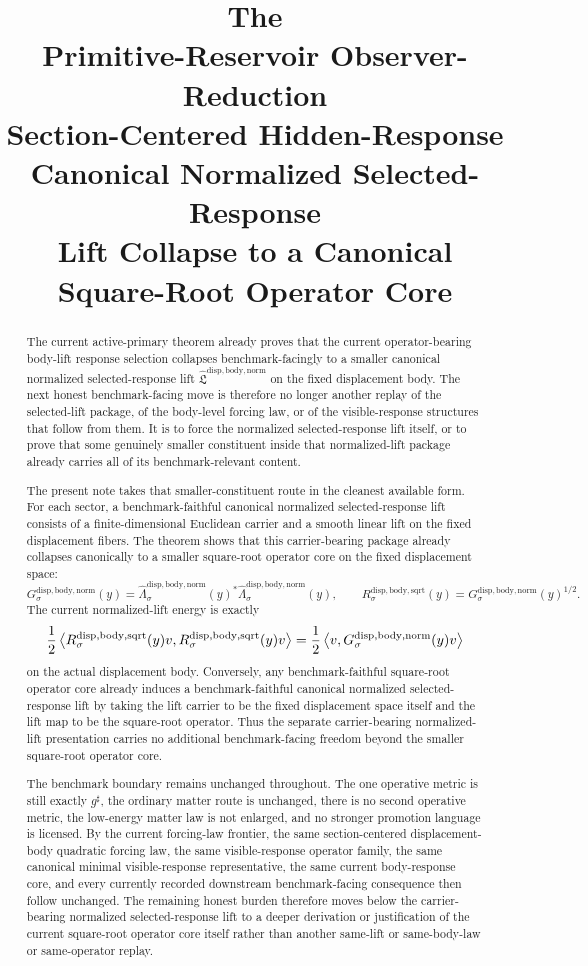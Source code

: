 \documentclass[11pt]{article}
\title{\textbf{The \TheoryName{}}\\[0.4em]
\large Primitive-Reservoir Observer-Reduction\\
\large Section-Centered Hidden-Response\\
\large Canonical Normalized Selected-Response\\
\large Lift Collapse to a Canonical\\
\large Square-Root Operator Core}
\author{}
\date{}
\newcommand{\CompletedMetric}{g^{\sharp}}
\newcommand{\NormalizedLiftPackage}{\widehat{\mathfrak L}^{\mathrm{disp,body,norm}}}
\newcommand{\NormalizedSelectedResponseLift}[1]{\widehat{\Lambda}_{#1}^{\mathrm{disp,body,norm}}}
\newcommand{\SquareRootOperator}[1]{R_{#1}^{\mathrm{disp,body,sqrt}}}
\newcommand{\GramOperator}[1]{G_{#1}^{\mathrm{disp,body,norm}}}
\begin{document}
\maketitle

\begin{abstract}
The current active-primary theorem already proves that the current operator-bearing body-lift response selection collapses benchmark-facingly to a smaller canonical normalized selected-response lift \(\NormalizedLiftPackage\) on the fixed displacement body. The next honest benchmark-facing move is therefore no longer another replay of the selected-lift package, of the body-level forcing law, or of the visible-response structures that follow from them. It is to force the normalized selected-response lift itself, or to prove that some genuinely smaller constituent inside that normalized-lift package already carries all of its benchmark-relevant content.

The present note takes that smaller-constituent route in the cleanest available form. For each sector, a benchmark-faithful canonical normalized selected-response lift consists of a finite-dimensional Euclidean carrier and a smooth linear lift on the fixed displacement fibers. The theorem shows that this carrier-bearing package already collapses canonically to a smaller square-root operator core on the fixed displacement space:
\[
\GramOperator{\sigma}(y)
=
\NormalizedSelectedResponseLift{\sigma}(y)^*
\NormalizedSelectedResponseLift{\sigma}(y),
\qquad
\SquareRootOperator{\sigma}(y)
=
\GramOperator{\sigma}(y)^{1/2}.
\]
The current normalized-lift energy is exactly
\[
\frac{1}{2}
\ev{
\SquareRootOperator{\sigma}(y)v,
\SquareRootOperator{\sigma}(y)v
}
=
\frac{1}{2}
\ev{
v,\GramOperator{\sigma}(y)v
}
\]
on the actual displacement body. Conversely, any benchmark-faithful square-root operator core already induces a benchmark-faithful canonical normalized selected-response lift by taking the lift carrier to be the fixed displacement space itself and the lift map to be the square-root operator. Thus the separate carrier-bearing normalized-lift presentation carries no additional benchmark-facing freedom beyond the smaller square-root operator core.

The benchmark boundary remains unchanged throughout. The one operative metric is still exactly \(\CompletedMetric\), the ordinary matter route is unchanged, there is no second operative metric, the low-energy matter law is not enlarged, and no stronger promotion language is licensed. By the current forcing-law frontier, the same section-centered displacement-body quadratic forcing law, the same visible-response operator family, the same canonical minimal visible-response representative, the same current body-response core, and every currently recorded downstream benchmark-facing consequence then follow unchanged. The remaining honest burden therefore moves below the carrier-bearing normalized selected-response lift to a deeper derivation or justification of the current square-root operator core itself rather than another same-lift or same-body-law or same-operator replay.
\end{abstract}
\end{document}
